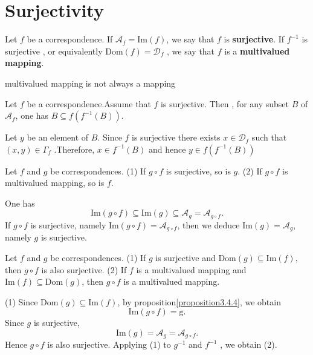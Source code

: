 \documentclass{book}
\numberwithin{equation}{section}
\begin{document}
\section{Surjectivity}
\begin{definitionenv}
    Let $f$ be a correspondence. If $\mathscr{A}_f=\mathrm{Im}(f)$,  we say that $f$ is \textbf{surjective}. If $f^{-1}$ is surjective ,  or equivalently $\mathrm{Dom}(f)=\mathscr{D}_f$ ,  we say that $f$ is a \textbf{multivalued mapping}.
\end{definitionenv}
\begin{remark}
    multivalued mapping is not always a mapping
\end{remark}
\begin{propositionenv}\label{proposition3.5.1}
    Let $f$ be a correspondence.Assume that $f$ is surjective. Then , for any subset $B$ of $\mathscr{A}_f$,  one has $B\subseteq f(f^{-1}(B))$.
\end{propositionenv}
\begin{proofenv}
    Let $y$ be an element of $B$. Since $f$ is surjective there exists $x\in \mathscr{D}_f$ such that $(x, y)\in \Gamma_f$ .Therefore,  $x\in f^{-1}(B)$ and hence $y\in f(f^{-1}(B))$
\end{proofenv}
\begin{propositionenv}\label{proposition3.5.2}
    Let $f$ and $g$ be correspondences.
    \newline
    (1) If $g\circ f$ is surjective,  so is $g$.
    \newline
    (2) If $g\circ f$ is multivalued mapping,  so is $f$.
\end{propositionenv}
\begin{proofenv}
    One has 
    $$\mathrm{Im}(g\circ f)\subseteq \mathrm{Im}(g)\subseteq \mathscr{A}_g=\mathscr{A}_{g\circ f}.$$
    If $g\circ f $ is surjective,  namely $\mathrm{Im}(g\circ f )=\mathscr{A}_{g\circ f}$,  then we deduce $\mathrm{Im}(g)=\mathscr{A}_g$,  namely $g$ is surjective.
\end{proofenv}
\begin{propositionenv}\label{proposition3.5.3}
    Let $f$ and $g$ be correspondences.
    \newline
    (1) If $g$ is surjective and $\mathrm{Dom}(g)\subseteq \mathrm{Im}(f)$, then $g\circ f $ is also surjective.
    \newline
    (2) If $f$ is a multivalued mapping and $\mathrm{Im}(f)\subseteq \mathrm{Dom}(g)$,  then $g\circ f $ is a multivalued mapping.
\end{propositionenv}
\begin{proofenv}
    (1) Since $\mathrm{Dom}(g)\subseteq \mathrm{Im}(f)$, by proposition\ref{proposition3.4.4}, we obtain 
    $$\mathrm{Im}(g\circ f )=\mathrm{g}.$$
    Since $g$ is surjective, 
    $$\mathrm{Im}(g)=\mathscr{A}_g=\mathscr{A}_{g\circ f}.$$
    Hence $g\circ f $ is also surjective.
    \newline
    Applying (1) to $g^{-1}$ and $f^{-1}$ , we obtain (2).
\end{proofenv}
\end{document}
